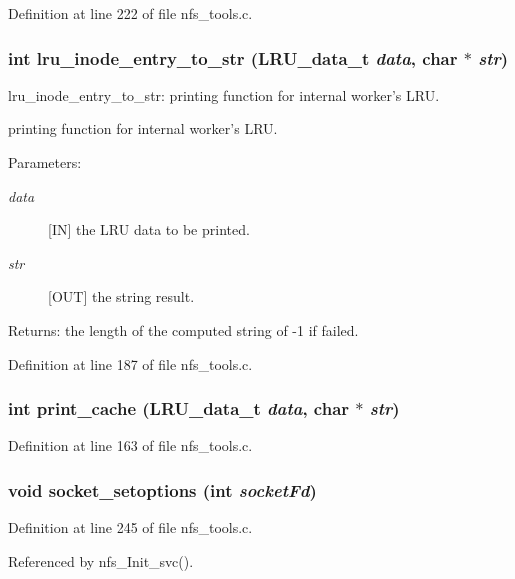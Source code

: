 Definition at line 222 of file nfs\_\-tools.c.
\subsubsection{\setlength{\rightskip}{0pt plus 5cm}int lru\_\-inode\_\-entry\_\-to\_\-str (LRU\_\-data\_\-t {\em data}, char $\ast$ {\em str})}\label{nfs__tools_8c_a6}


lru\_\-inode\_\-entry\_\-to\_\-str: printing function for internal worker's LRU.

printing function for internal worker's LRU.

\begin{Desc}
\item[Parameters:]
\begin{description}
\item[{\em data}][IN] the LRU data to be printed. \item[{\em str}][OUT] the string result.\end{description}
\end{Desc}
\begin{Desc}
\item[Returns:]the length of the computed string of -1 if failed. \end{Desc}


Definition at line 187 of file nfs\_\-tools.c.
\subsubsection{\setlength{\rightskip}{0pt plus 5cm}int print\_\-cache (LRU\_\-data\_\-t {\em data}, char $\ast$ {\em str})}\label{nfs__tools_8c_a4}




Definition at line 163 of file nfs\_\-tools.c.
\subsubsection{\setlength{\rightskip}{0pt plus 5cm}void socket\_\-setoptions (int {\em socket\-Fd})}\label{nfs__tools_8c_a10}




Definition at line 245 of file nfs\_\-tools.c.

Referenced by nfs\_\-Init\_\-svc().
